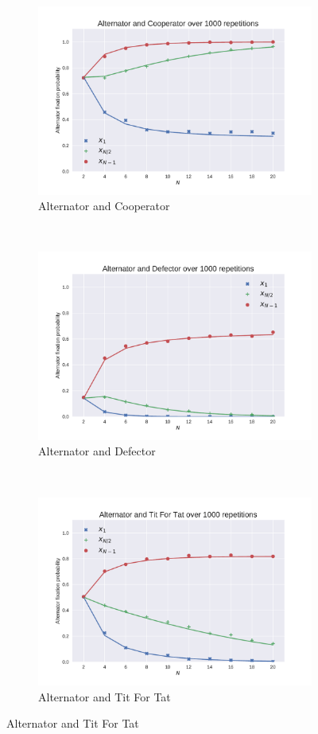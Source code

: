 \documentclass{article}
\begin{document}
\begin{figure}[!hbtp]
    \centering
    \begin{subfigure}[t]{.3\textwidth}
        \centering
        \includegraphics[width=.8\textwidth]{./img/Alternator_v_Cooperator.pdf}
        \caption{Alternator and Cooperator}
    \end{subfigure}%
    ~
    \begin{subfigure}[t]{.3\textwidth}
        \centering
        \includegraphics[width=.8\textwidth]{./img/Alternator_v_Defector.pdf}
        \caption{Alternator and Defector}
    \end{subfigure}%
    ~
    \begin{subfigure}[t]{.3\textwidth}
        \centering
        \includegraphics[width=.8\textwidth]{./img/Alternator_v_Tit_For_Tat.pdf}
        \caption{Alternator and Tit For Tat}
    \end{subfigure}%


\end{figure}
\end{document}
